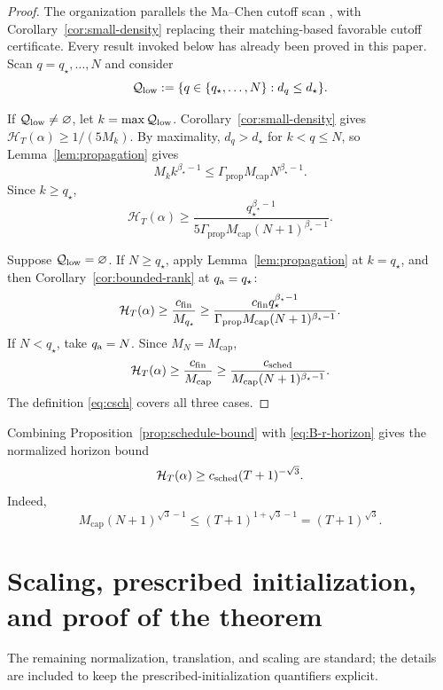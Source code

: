 \documentclass[11pt]{article}
\theoremstyle{definition}
\theoremstyle{remark}
\newcommand{\cert}{\mathcal{H}}
\newcommand{\rankmass}{M}
\newcommand{\rankdens}{d}
\newcommand{\criticalexp}{\beta_{\star}}
\newcommand{\threshold}{d_{\star}}
\newcommand{\rankcut}{q_{\star}}
\newcommand{\propconst}{\Gamma_{\mathrm{prop}}}
\begin{document}
\begin{proof}
The organization parallels the Ma--Chen cutoff scan
\cite[Section~6.3]{machen2026}, with
Corollary~\ref{cor:small-density} replacing their matching-based favorable
cutoff certificate.  Every result invoked below has already been proved in
this paper.  Scan \(q=\rankcut,\ldots,N\) and consider
\[
 \mathcal Q_{\rm low}
 :=\{q\in\{\rankcut,\ldots,N\}:\rankdens_q\le\threshold\}.
\]

If \(\mathcal Q_{\rm low}\neq\varnothing\), let
\(k=\max\mathcal Q_{\rm low}\).
Corollary~\ref{cor:small-density} gives
\(\cert_T(\alpha)\ge1/(5\rankmass_k)\).  By maximality,
\(\rankdens_q>\threshold\) for \(k<q\le N\), so
Lemma~\ref{lem:propagation} gives
\[
 \rankmass_k k^{\criticalexp-1}
 \le\propconst\rankmass_{\mathrm{cap}}N^{\criticalexp-1}.
\]
Since \(k\ge\rankcut\),
\[
 \cert_T(\alpha)
 \ge\frac{\rankcut^{\criticalexp-1}}
 {5\propconst\rankmass_{\mathrm{cap}}(N+1)^{\criticalexp-1}}.
\]

Suppose \(\mathcal Q_{\rm low}=\varnothing\).  If \(N\ge\rankcut\),
apply Lemma~\ref{lem:propagation} at \(k=\rankcut\), and then
Corollary~\ref{cor:bounded-rank} at \(q_{\rm a}=\rankcut\):
\[
 \cert_T(\alpha)
 \ge\frac{c_{\rm fin}}{\rankmass_{\rankcut}}
 \ge\frac{c_{\rm fin}\rankcut^{\criticalexp-1}}
          {\propconst\rankmass_{\mathrm{cap}}(N+1)^{\criticalexp-1}}.
\]
If \(N<\rankcut\), take \(q_{\rm a}=N\).  Since
\(\rankmass_N=\rankmass_{\mathrm{cap}}\),
\[
 \cert_T(\alpha)\ge\frac{c_{\rm fin}}{\rankmass_{\mathrm{cap}}}
 \ge\frac{c_{\rm sched}}
 {\rankmass_{\mathrm{cap}}(N+1)^{\criticalexp-1}}.
\]
The definition \eqref{eq:csch} covers all three cases.
\end{proof}

Combining Proposition~\ref{prop:schedule-bound} with
\eqref{eq:B-r-horizon} gives the normalized horizon bound
\begin{equation}
 \cert_T(\alpha)
 \ge c_{\rm sched}(T+1)^{-\sqrt3}.
 \label{eq:C-horizon}
\end{equation}
Indeed,
\[
 \rankmass_{\mathrm{cap}}(N+1)^{\sqrt3-1}
 \le(T+1)^{1+\sqrt3-1}=(T+1)^{\sqrt3}.
\]

\section{Scaling, prescribed initialization, and proof of the theorem}
\label{sec:scaling}

The remaining normalization, translation, and scaling are standard; the
details are included to keep the prescribed-initialization quantifiers
explicit.
\end{document}
